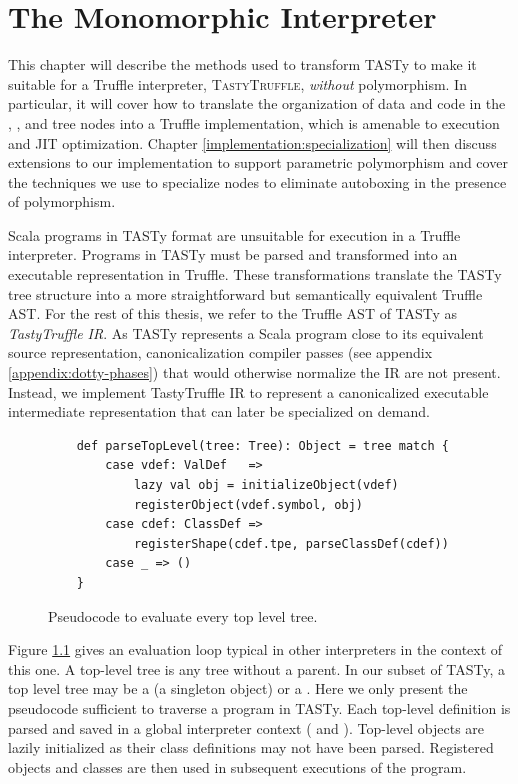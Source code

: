 \chapter{The Monomorphic Interpreter}
\label{chapter:implementation}

This chapter will describe the methods used to transform TASTy to make it suitable for a Truffle interpreter, \textsc{TastyTruffle}, \textit{without} polymorphism.
In particular, it will cover how to translate the organization of data and code in the , , and  tree nodes into a Truffle implementation, which is amenable to execution and JIT optimization.
Chapter \ref{implementation:specialization} will then discuss extensions to our implementation to support parametric polymorphism and cover the techniques we use to specialize nodes to eliminate autoboxing in the presence of polymorphism. 

Scala programs in TASTy format are unsuitable for execution in a Truffle interpreter. 
Programs in TASTy must be parsed and transformed into an executable representation in Truffle.
These transformations translate the TASTy tree structure into a more straightforward but semantically equivalent Truffle AST.
For the rest of this thesis, we refer to the Truffle AST of TASTy as \textit{TastyTruffle IR}.
As TASTy represents a Scala program close to its equivalent source representation, canonicalization compiler passes (see appendix \ref{appendix:dotty-phases}) that would otherwise normalize the IR are not present. 
Instead, we implement TastyTruffle IR to represent a canonicalized executable intermediate representation that can later be specialized on demand. 

\begin{figure}[!htb]
	\begin{verbatim}
	def parseTopLevel(tree: Tree): Object = tree match {
		case vdef: ValDef   => 
			lazy val obj = initializeObject(vdef)
			registerObject(vdef.symbol, obj)			
		case cdef: ClassDef => 
			registerShape(cdef.tpe, parseClassDef(cdef))	
		case _ => ()
	}
	\end{verbatim}
	\caption{Pseudocode to evaluate every top level tree.}
	\label{impl:top-level}
\end{figure}

Figure \ref{impl:top-level} gives an evaluation loop typical in other interpreters in the context of this one.
A top-level tree is any tree without a parent.
In our subset of TASTy, a top level tree may be a  (a singleton object) or a .
Here we only present the pseudocode sufficient to traverse a program in TASTy. 
Each top-level definition is parsed and saved in a global interpreter context ( and ).
Top-level objects are lazily initialized as their class definitions may not have been parsed.
Registered objects and classes are then used in subsequent executions of the program.

